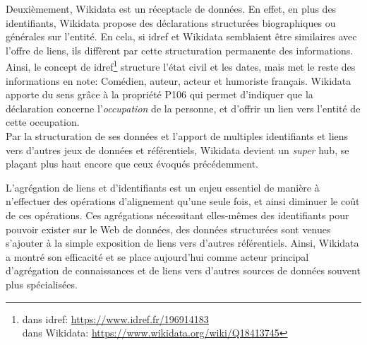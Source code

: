 Deuxièmement, Wikidata est un réceptacle de données. En effet, en plus des identifiants, Wikidata propose des déclarations structurées biographiques ou générales sur l'entité. En cela, si \ac{idref} et Wikidata semblaient être similaires avec l'offre de liens, ils diffèrent par cette structuration permanente des informations. Ainsi,  le concept  de \ac{idref}\footnote{ dans \ac{idref}: \url{https://www.idref.fr/196914183}\\ dans Wikidata: \url{https://www.wikidata.org/wiki/Q18413745}} structure l'état civil et les dates, mais met le reste des informations en note: \og Comédien, auteur, acteur et humoriste français\fg{}. Wikidata apporte du sens grâce à la propriété P106 qui permet d'indiquer que la déclaration concerne l'\textit{occupation} de la personne, et d'offrir un lien vers l'entité de cette occupation.\\

Par la structuration de ses données et l'apport de multiples identifiants et liens vers d'autres jeux de données et référentiels, Wikidata devient un \textit{super} hub, se plaçant plus haut encore que ceux évoqués précédemment.

\bigskip
\bigskip
L'agrégation de liens et d'identifiants est un enjeu essentiel de manière à n'effectuer des opérations d'alignement qu'une seule fois, et ainsi diminuer le coût de ces opérations. Ces agrégations nécessitant elles-mêmes des identifiants pour pouvoir exister sur le Web de données, des données structurées sont venues s'ajouter à la simple exposition de liens vers d'autres référentiels. Ainsi, Wikidata a montré son efficacité et se place aujourd'hui comme acteur principal d'agrégation de connaissances et de liens vers d'autres sources de données souvent plus spécialisées.